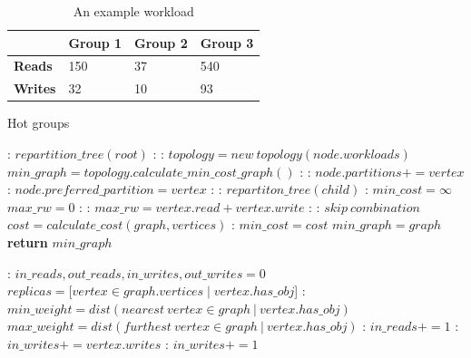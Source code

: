 \begin{table}[!htb]
  \centering
  \begin{tabular}{l l l l}
    \hline
    & \textbf{Group 1} & \textbf{Group 2} & \textbf{Group 3} \\
    \hline
    \textbf{Reads} & 150 & 37 & 540 \\
    \textbf{Writes} & 32 & 10 & 93 \\
    \hline
  \end{tabular}

  \caption{ An example workload }\label{tab:hot-groups-example}
\end{table}

\begin{algorithm}
  \caption{Hot groups}\label{alg:hot-groups}
  \begin{algorithmic}[1]
  :
  \State $repartition\_tree(root)$
  \EndFunction
  :
    :
      \State $topology = new\ topology(node.workloads)$
      \State $min\_graph =  topology.calculate\_min\_cost\_graph()$
      :
        :
        \State $node.partitions += vertex$
          :
            \State $node.preferred\_partition = vertex$
          \EndIf
        \EndIf
      \EndFor
    \EndIf
    :
      :
        \State $repartiton\_tree(child)$
        \EndFor
    \EndIf
    \EndFunction
    :
    \State $min\_cost = \infty$
    \State $max\_rw = 0$
    :
      :
        \State $max\_rw = vertex.read + vertex.write$
      \EndIf
    \EndFor
    :
      :
          \State $skip\ combination$
        \EndIf
      \EndFor
      \State $cost = calculate\_cost(graph, vertices)$
      :
        \State $min\_cost = cost$
        \State $min\_graph = graph$
      \EndIf
    \EndFor
    \State \textbf{return} $min\_graph$
    \EndFunction

    :
      \State $in\_reads, out\_reads, in\_writes, out\_writes = 0$
      \State $replicas = [vertex \in graph.vertices \mid vertex.has\_obj$]
      :
      \State $min\_weight = dist(nearest\ vertex \in graph\ |\  vertex.has\_obj)$
      \State $max\_weight = dist(furthest\ vertex \in graph\ |\ vertex.has\_obj)$
        :
          \State $in\_reads+= 1$
          :
          \State $in\_writes+= vertex.writes$
          \Else:
          \State  $in\_writes+= 1 $
          \EndIf
		\end{algorithmic}
	\end{algorithm}
